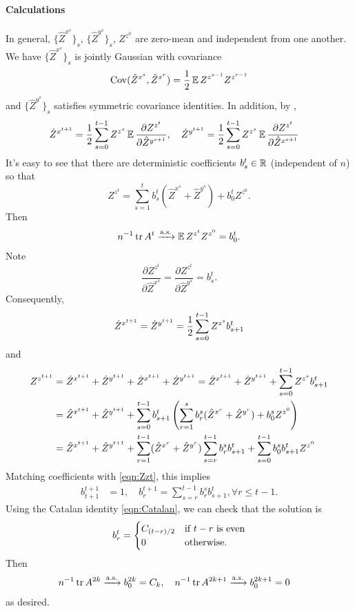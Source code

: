 \documentclass[main.tex]{subfiles}
\begin{document}
\paragraph{Calculations}
In general, $\{\hat{Z}^{x^{s}}\}_{s}$, $\{\hat{Z}^{y^{s}}\}_{s}$, $Z^{z^0}$ are zero-mean and independent from one another.
We have $\{\hat{Z}^{x^{s}}\}_{s}$ is jointly Gaussian with covariance
\[
\operatorname{Cov}(\hat{Z}^{x^{s}},\hat{Z}^{x^{r}})=\frac{1}{2}\operatorname*{\mathbb{E}} Z^{z^{s-1}}Z^{z^{r-1}}
\]
and $\{\hat{Z}^{y^{s}}\}_{s}$ satisfies symmetric covariance identities.
In addition, by ,
\begin{align*}
\dot Z^{x^{t+1}} & =\frac{1}{2}\sum_{s=0}^{t-1}Z^{z^{s}}\operatorname*{\mathbb{E}}\frac{\partial Z^{z^{t}}}{\partial\hat{Z}^{y^{s+1}}},\quad
\dot Z^{y^{t+1}} =\frac{1}{2}\sum_{s=0}^{t-1}Z^{z^{s}}\operatorname*{\mathbb{E}}\frac{\partial Z^{z^{t}}}{\partial\hat{Z}^{x^{s+1}}}
\end{align*}
It's easy to see that there are deterministic coefficients $b_{s}^{t} \in \mathbb{R}$ (independent of $n$) so that 
\begin{equation}
Z^{z^{t}}=\sum_{s=1}^{t}b_{s}^{t}(\hat{Z}^{x^{s}}+\hat{Z}^{y^{s}})+b_{0}^{t}Z^{z^{0}}.
\label{eqn:Zzt}
\end{equation}
Then
\[{n}^{-1} \operatorname{tr} A^t \xrightarrow{\mathrm{a.s.}} \operatorname*{\mathbb{E}} Z^{z^t} Z^{z^0} = b^t_0.\]
Note
\[
\frac{\partial Z^{z^{t}}}{\partial\hat{Z}^{x^{s}}}=\frac{\partial Z^{z^{t}}}{\partial\hat{Z}^{y^{s}}}=b_{s}^{t}.
\]
Consequently,
\[
\dot Z^{x^{t+1}}=\dot Z^{y^{t+1}}=\frac{1}{2}\sum_{s=0}^{t-1}Z^{z^{s}}b_{s+1}^{t}
\]
and
\begin{align*}
Z^{z^{t+1}} & =\hat{Z}^{x^{t+1}}+\hat{Z}^{y^{t+1}}+\dot Z^{x^{t+1}}+\dot Z^{y^{t+1}}
  =\hat{Z}^{x^{t+1}}+\hat{Z}^{y^{t+1}}+\sum_{s=0}^{t-1}Z^{z^{s}}b_{s+1}^{t}\\
 & =\hat{Z}^{x^{t+1}}+\hat{Z}^{y^{t+1}}+\sum_{s=0}^{t-1}b_{s+1}^{t}\left(\sum_{r=1}^{s}b_{r}^{s}(\hat{Z}^{x^{r}}+\hat{Z}^{y^{r}})+b_{0}^{s}Z^{z^{0}}\right)\\
 & =\hat{Z}^{x^{t+1}}+\hat{Z}^{y^{t+1}}+\sum_{r=1}^{t-1}(\hat{Z}^{x^{r}}+\hat{Z}^{y^{r}})\sum_{s=r}^{t-1}b_{r}^{s}b_{s+1}^{t}+\sum_{s=0}^{t-1}b_{0}^{s}b_{s+1}^{t}Z^{z^{0}}
\end{align*}
Matching coefficients with \cref{eqn:Zzt}, this implies
\begin{align*}
b_{t+1}^{t+1} & =1,\quad
b_{r}^{t+1} =\sum_{s=r}^{t-1}b_{r}^{s}b_{s+1}^{t},\forall r\le t-1.
\end{align*}
Using the Catalan identity \cref{eqn:Catalan}, we can check that the solution is
\[
b_{r}^{t}=\begin{cases}
C_{(t-r)/2} & \text{if \ensuremath{t-r} is even}\\
0 & \text{otherwise.}
\end{cases}
\]
Then
\begin{align*}
{n}^{-1} \operatorname{tr} A^{2k} & \xrightarrow{\mathrm{a.s.}} b_{0}^{2k}=C_{k},\quad
{n}^{-1} \operatorname{tr} A^{2k+1} \xrightarrow{\mathrm{a.s.}} b_{0}^{2k+1}=0
\end{align*}
as desired.
\end{document}
